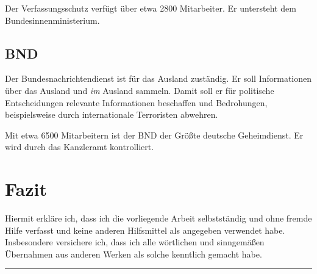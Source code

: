 \documentclass[12pt,a4paper]{scrartcl}
\begin{document}
Der Verfassungsschutz verfügt über etwa 2800 Mitarbeiter. Er untersteht dem Bundesinnenministerium.\cite{ard_geheimdienste}

\subsection{BND}
Der Bundesnachrichtendienst ist für das Ausland zuständig. Er soll Informationen über das Ausland und \emph{im} Ausland sammeln. Damit soll er für politische Entscheidungen relevante Informationen beschaffen und Bedrohungen, beispielsweise durch internationale Terroristen abwehren.\cite{ard_geheimdienste}

Mit etwa 6500 Mitarbeitern ist der BND der Größte deutsche Geheimdienst. Er wird durch das Kanzleramt kontrolliert.\cite{ard_geheimdienste}

\section{Fazit}

\newpage
\printbibliography
\newpage

Hiermit erkläre ich, dass ich die vorliegende Arbeit selbstständig und ohne fremde Hilfe verfasst und keine anderen Hilfsmittel als angegeben verwendet habe. Insbesondere versichere ich, dass ich alle wörtlichen und sinngemäßen Übernahmen aus anderen Werken als solche kenntlich gemacht habe.
\vspace{2cm}
\hrule
\end{document}
